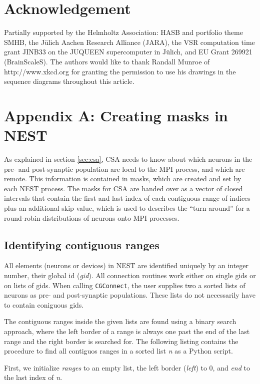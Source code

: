\documentclass{frontiersSCNS} %
\begin{document}
\section*{Acknowledgement}
Partially supported by the Helmholtz Association: HASB and portfolio
theme SMHB, the Jülich Aachen Research Alliance (JARA), the VSR
computation time grant JINB33 on the JUQUEEN supercomputer in Jülich,
and EU Grant 269921 (BrainScaleS). The authors would like to thank
Randall Munroe of http://www.xkcd.org for granting the permission to
use his drawings in the sequence diagrams throughout this article.

\section*{Appendix A: Creating masks in NEST}\label{sec:creating_masks}

As explained in section \ref{sec:csa}, CSA needs to know about which
neurons in the pre- and post-synaptic population are local to the MPI
process, and which are remote. This information is contained in masks,
which are created and set by each NEST process. The masks for CSA are
handed over as a vector of closed intervals that contain the first and
last index of each contiguous range of indices plus an additional skip
value, which is used to describes the ``turn-around'' for a round-robin
distributions of neurons onto MPI processes.

\subsection*{Identifying contiguous ranges}

All elements (neurons or devices) in NEST are identified uniquely by
an integer number, their global id (\emph{gid}). All connection
routines work either on single gids or on lists of gids. When calling
\texttt{CGConnect}, the user supplies two a sorted lists of neurons as
pre- and post-synaptic populations. These lists do not necessarily
have to contain coniguous gids.

The contiguous ranges inside the given lists are found using a binary
search approach, where the left border of a range is always one past
the end of the last range and the right border is searched for. The
following listing contains the procedure to find all contiguos ranges
in a sorted list \emph{n} as a Python script.

First, we initialize \emph{ranges} to an empty list, the left border
(\emph{left}) to 0, and \emph{end} to the last index of \emph{n}.
\end{document}
